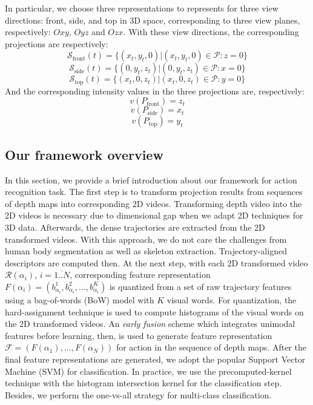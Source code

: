 \documentclass[final,3p,times,twocolumn]{elsarticle}
\begin{document}
In particular, we choose three representations to represents for three view directions: front, side, and top in 3D space, corresponding to three view planes, respectively: $Oxy$, $Oyz$ and $Ozx$. With these view directions, the corresponding projections are respectively:
\begin{equation}
\mathcal{S}_\text{front}(t) = \{(x_t,y_t,0)\vert(x_t,y_t,0) \in \mathcal{P}:z=0\}
\end{equation}
\begin{equation}
\mathcal{S}_\text{side}(t) = \{(0,y_t,z_t)\vert(0,y_t,z_t) \in \mathcal{P}:x=0\}
\end{equation}
\begin{equation}
\mathcal{S}_\text{top}(t) = \{(x_t,0,z_t)\vert(x_t,0,z_t) \in \mathcal{P}:y=0\}
\end{equation}
And the corresponding intensity values in the three projections are, respectively:
\begin{equation}
	v(P_\text{front}) = z_t
\end{equation}
\begin{equation}
	v(P_\text{side}) = x_t
\end{equation}
\begin{equation}
	v(P_\text{top}) = y_t
\end{equation}

\subsection{Our framework overview}

In this section, we provide a brief introduction about our framework for action recognition task.
The first step is to transform projection results from sequences of depth maps into corresponding 2D videos.
Transforming depth video into the 2D videos is necessary due to dimensional gap when we adapt 2D techniques for 3D data.
Afterwards, the dense trajectories \cite{wang2011densetraj} are extracted from the 2D transformed videos.
With this approach, we do not care the challenges from human body segmentation as well as skeleton extraction.
Trajectory-aligned descriptors are computed then. At the next step, with each 2D transformed video $\mathcal{R}(\alpha_i)$, $i = \overline{1..N}$, corresponding feature representation $F(\alpha_i) = (b^1_\text{$\alpha_i$},b^2_\text{$\alpha_i$},...,b^K_\text{$\alpha_i$})$ is quantized from a set of raw trajectory features using a bag-of-words (BoW) model with $K$ visual words.
For quantization, the hard-assignment technique is used to compute histograms of the visual words on the 2D transformed videos.
An \textit{early fusion} scheme which integrates unimodal features before learning, then, is used to generate feature representation $\mathcal{F} = (F(\alpha_1),...,F(\alpha_N))$ for action in the sequence of depth maps.
After the final feature representations are generated, we adopt the popular Support Vector Machine (SVM) for classification. In practice, we use the precomputed-kernel technique with the histogram intersection kernel for the classification step.
Besides, we perform the one-vs-all strategy for multi-class classification.
\end{document}
